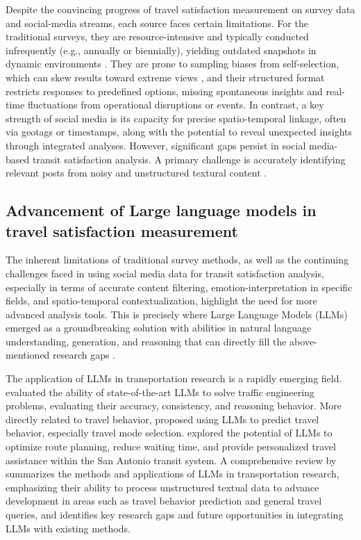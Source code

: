 \documentclass[a4paper,fleqn,12pt]{cas-sc}
\begin{document}
Despite the convincing progress of travel satisfaction measurement on survey data and social-media streams, each source faces certain limitations. For the traditional surveys, they are resource-intensive and typically conducted infrequently (e.g., annually or biennially), yielding outdated snapshots in dynamic environments \citep{liu2019nat}. They are prone to sampling biases from self-selection, which can skew results toward extreme views \citep{rodriguezvale2019imp}, and their structured format restricts responses to predefined options, missing spontaneous insights and real-time fluctuations from operational disruptions or events. In contrast, a key strength of social media is its capacity for precise spatio-temporal linkage, often via geotags or timestamps, along with the potential to reveal unexpected insights through integrated analyses. However, significant gaps persist in social media-based transit satisfaction analysis. A primary challenge is accurately identifying relevant posts from noisy and unstructured textural content \citep{alsahar2023twi, liu2019nat}.

\subsection{Advancement of Large language models in travel satisfaction measurement}
The inherent limitations of traditional survey methods, as well as the continuing challenges faced in using social media data for transit satisfaction analysis, especially in terms of accurate content filtering, emotion-interpretation in specific fields, and spatio-temporal contextualization, highlight the need for more advanced analysis tools. This is precisely where Large Language Models (LLMs) emerged as a groundbreaking solution with abilities in natural language understanding, generation, and reasoning that can directly fill the above-mentioned research gaps \citep{liu2025trip}.

The application of LLMs in transportation research is a rapidly emerging field. \cite{syed2024ben} evaluated the ability of state-of-the-art LLMs to solve traffic engineering problems, evaluating their accuracy, consistency, and reasoning behavior. More directly related to travel behavior, \cite{mo2023lar} proposed using LLMs to predict travel behavior, especially travel mode selection. \cite{jonnala2025exp} explored the potential of LLMs to optimize route planning, reduce waiting time, and provide personalized travel assistance within the San Antonio transit system. A comprehensive review by \cite{yan2025lar} summarizes the methods and applications of LLMs in transportation research, emphasizing their ability to process unstructured textual data to advance development in areas such as travel behavior prediction and general travel queries, and identifies key research gaps and future opportunities in integrating LLMs with existing methods.
\end{document}
